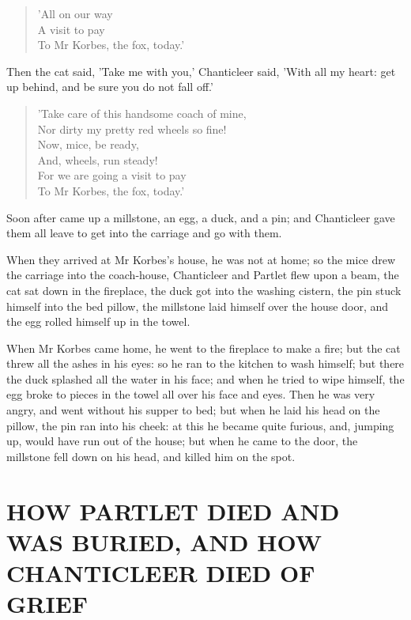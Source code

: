 \documentclass[12pt]{book}
\begin{document}
\begin{verse}
 'All on our way\\
  A visit to pay\\
  To Mr Korbes, the fox, today.'
\end{verse}

Then the cat said, 'Take me with you,' Chanticleer said, 'With all my
heart: get up behind, and be sure you do not fall off.'

\begin{verse}
 'Take care of this handsome coach of mine,\\
  Nor dirty my pretty red wheels so fine!\\
  Now, mice, be ready,\\
  And, wheels, run steady!\\
  For we are going a visit to pay\\
  To Mr Korbes, the fox, today.'
\end{verse}

Soon after came up a millstone, an egg, a duck, and a pin; and
Chanticleer gave them all leave to get into the carriage and go with
them.

When they arrived at Mr Korbes's house, he was not at home; so the
mice drew the carriage into the coach-house, Chanticleer and Partlet
flew upon a beam, the cat sat down in the fireplace, the duck got into
the washing cistern, the pin stuck himself into the bed pillow, the
millstone laid himself over the house door, and the egg rolled himself
up in the towel.

When Mr Korbes came home, he went to the fireplace to make a fire; but
the cat threw all the ashes in his eyes: so he ran to the kitchen to
wash himself; but there the duck splashed all the water in his face;
and when he tried to wipe himself, the egg broke to pieces in the
towel all over his face and eyes. Then he was very angry, and went
without his supper to bed; but when he laid his head on the pillow,
the pin ran into his cheek: at this he became quite furious, and,
jumping up, would have run out of the house; but when he came to the
door, the millstone fell down on his head, and killed him on the spot.


\section[HOW PARTLET DIED AND WAS BURIED, AND\ldots]{HOW PARTLET DIED AND WAS BUR\-IED, AND HOW CHANTICLEER DIED OF GRIEF}
\end{document}

